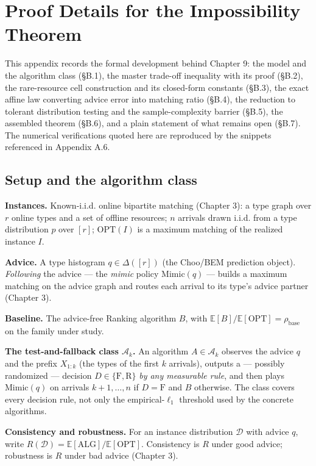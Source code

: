 \chapter{Proof Details for the Impossibility
Theorem}

This appendix records the formal development behind Chapter 9: the model
and the algorithm class (§B.1), the master trade-off inequality with its
proof (§B.2), the rare-resource cell construction and its closed-form
constants (§B.3), the exact affine law converting advice error into
matching ratio (§B.4), the reduction to tolerant distribution testing
and the sample-complexity barrier (§B.5), the assembled theorem (§B.6),
and a plain statement of what remains open (§B.7). The numerical
verifications quoted here are reproduced by the snippets referenced in
Appendix A.6.

\section{Setup and the algorithm
class}

\textbf{Instances.} Known-i.i.d. online bipartite matching (Chapter 3):
a type graph over \(r\) online types and a set of offline resources;
\(n\) arrivals drawn i.i.d. from a type distribution \(p\) over \([r]\);
\(\mathrm{OPT}(I)\) is a maximum matching of the realized instance
\(I\).

\textbf{Advice.} A type histogram \(q\in\Delta([r])\) (the Choo/BEM
prediction object). \emph{Following} the advice --- the \emph{mimic}
policy \(\mathrm{Mimic}(q)\) --- builds a maximum matching on the advice
graph and routes each arrival to its type's advice partner (Chapter 3).

\textbf{Baseline.} The advice-free Ranking algorithm \(B\), with
\(\mathbb E[B]/\mathbb E[\mathrm{OPT}] = \rho_{\mathrm{base}}\) on the
family under study.

\textbf{The test-and-fallback class \(\mathcal A_k\).} An algorithm
\(A\in\mathcal A_k\) observes the advice \(q\) and the prefix
\(X_{1:k}\) (the types of the first \(k\) arrivals), outputs a ---
possibly randomized --- decision \(D\in\{\mathrm F,\mathrm R\}\)
\emph{by any measurable rule}, and then plays \(\mathrm{Mimic}(q)\) on
arrivals \(k+1,\dots,n\) if \(D=\mathrm F\) and \(B\) otherwise. The
class covers every decision rule, not only the empirical-\(\ell_1\)
threshold used by the concrete algorithms.

\textbf{Consistency and robustness.} For an instance distribution
\(\mathcal D\) with advice \(q\), write
\(R(\mathcal D)=\mathbb E[\mathrm{ALG}]/\mathbb E[\mathrm{OPT}]\).
Consistency is \(R\) under good advice; robustness is \(R\) under bad
advice (Chapter 3).

